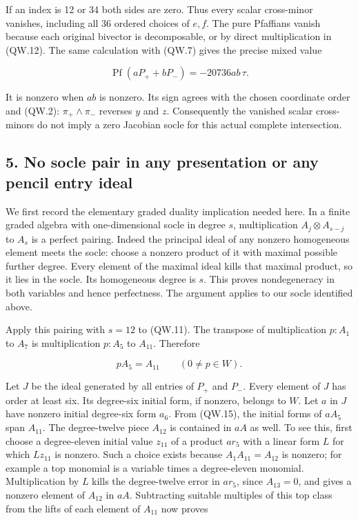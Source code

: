 If an index is 12 or 34 both sides are zero. Thus every scalar
cross-minor vanishes, including all 36 ordered choices of \(e,f\).
The pure Pfaffians vanish because each original bivector is
decomposable, or by direct multiplication in (QW.12). The same
calculation with (QW.7) gives the precise mixed value

\[
 \operatorname{Pf}(aP_++bP_-)=-20736ab\,\tau.
\tag{QW.14}
\]

It is nonzero when \(ab\) is nonzero. Its sign agrees with the chosen
coordinate order and (QW.2): \(\pi_+\wedge\pi_-\) reverses \(y\) and \(z\).
Consequently the vanished scalar cross-minors do not imply a zero
Jacobian socle for this actual complete intersection.

\subsection{5. No socle pair in any presentation or any pencil entry ideal}\label{SF-E848W:s5}

We first record the elementary graded duality implication needed
here. In a finite graded algebra with one-dimensional socle in degree
\(s\), multiplication \(A_j\otimes A_{s-j}\) to \(A_s\) is a perfect pairing.
Indeed the principal ideal of any nonzero homogeneous element meets
the socle: choose a nonzero product of it with maximal possible
further degree. Every element of the maximal ideal kills
that maximal product, so it lies in the socle. Its homogeneous
degree is \(s\). This proves nondegeneracy in both variables and hence
perfectness. The argument applies to our socle identified above.

Apply this pairing with \(s=12\) to (QW.11). The transpose of
multiplication \(p:A_1\) to \(A_7\) is multiplication \(p:A_5\) to \(A_{11}\).
Therefore

\[
            pA_5=A_{11}\qquad(0\ne p\in W).
\tag{QW.15}
\]

Let \(J\) be the ideal generated by all entries of \(P_+\) and \(P_-\). Every
element of \(J\) has order at least six. Its degree-six initial form,
if nonzero, belongs to \(W\). Let \(a\) in \(J\) have nonzero initial degree-six
form \(a_6\). From (QW.15), the initial forms of \(aA_5\) span \(A_{11}\). The
degree-twelve piece \(A_{12}\) is contained in \(aA\) as well. To see this,
first choose a degree-eleven initial value \(z_{11}\) of a product \(ar_5\)
with a linear form \(L\) for which \(Lz_{11}\) is nonzero. Such a choice
exists because \(A_1A_{11}=A_{12}\) is nonzero; for example a top monomial
is a variable times a degree-eleven monomial. Multiplication by \(L\)
kills the degree-twelve error in \(ar_5\), since \(A_{13}=0\), and gives
a nonzero element of \(A_{12}\) in \(aA\). Subtracting suitable multiples of
this top class from the lifts of each element of \(A_{11}\) now proves

